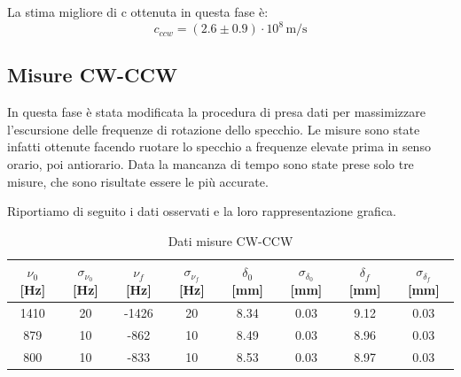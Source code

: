 \documentclass{article}
\begin{document}
\begin{table}[H]
\begin{minipage}{0.65\linewidth}
                \end{minipage}
                
            \end{table}

            La stima migliore di c ottenuta in questa fase è: \[ c_{ccw} = (2.6 \pm 0.9)\cdot10^8 \, \mathrm{m/s} \] 
         
        
        \subsection{Misure CW-CCW}

            In questa fase è stata modificata la procedura di presa dati per massimizzare l'escursione delle frequenze di rotazione dello specchio. 
            Le misure sono state infatti ottenute facendo ruotare lo specchio a frequenze elevate prima in senso orario, poi antiorario. 
            Data la mancanza di tempo sono state prese solo tre misure, che sono risultate essere le più accurate. 
            
            Riportiamo di seguito i dati osservati e la loro rappresentazione grafica.
            
            \begin{table}[H]

                \centering
                \begin{tabular}{c c c c c c c c} 

                    \toprule
                    $\nu_0$ [Hz] & $\sigma_{\nu_0}$ [Hz] & $\nu_f$ [Hz] &  $\sigma_{\nu_f}$ [Hz] & 
                    $\delta_0$ [mm] & $\sigma_{\delta_0}$ [mm] & $\delta_f$ [mm] & $\sigma_{\delta_f}$ [mm] \\ 
                    
                    \midrule
                    1410 & 20 & -1426 & 20 & 8.34 & 0.03 & 9.12 & 0.03  \\ 
                    879 & 10 & -862 & 10 & 8.49 & 0.03 & 8.96 & 0.03  \\ 
                    800 & 10 & -833 & 10 & 8.53 & 0.03 & 8.97 & 0.03  \\ 
                    \bottomrule           
                
                \end{tabular}

                \caption{Dati misure CW-CCW}

            \end{table}
\end{document}
